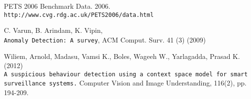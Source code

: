 \begin{thebibliography}{20}
PETS 2006 Benchmark Data. 2006.
\\\texttt{http://www.cvg.rdg.ac.uk/PETS2006/data.html}

C. Varun, B. Arindam, K. Vipin, 
\\\texttt{Anomaly Detection: A survey}, ACM Comput. Surv. 41 (3) (2009)

Wiliem, Arnold, Madasu, Vamsi K., Boles, Wageeh W., Yarlagadda, Prasad K. (2012) 
\\\texttt{A suspicious behaviour detection using a context space
model for smart surveillance systems.} 
Computer Vision and Image Understanding,
116(2), pp. 194-209.
 


\end{thebibliography}
